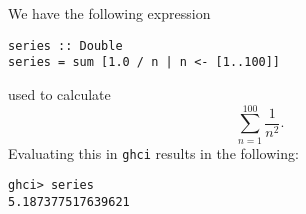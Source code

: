 
We have the following expression 
\begin{verbatim}
series :: Double
series = sum [1.0 / n | n <- [1..100]]
\end{verbatim}
used to calculate
\[
    \sum_{n=1}^{100} \frac{1}{n^2}.
\]
Evaluating this in \verb|ghci| results in the following:
\begin{verbatim}
ghci> series
5.187377517639621
\end{verbatim}

